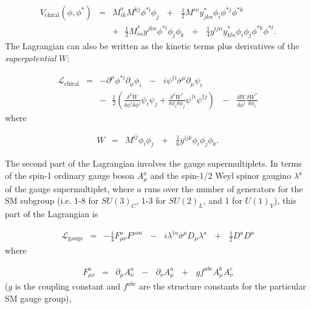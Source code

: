 \documentclass[dissertation.tex]{subfiles}
\begin{document}
\begin{eqnarray}
\label{eq:V_chiral}
V_{\mathrm{chiral}}(\phi, \phi^{*}) &=& M_{ik}^{*}M^{kj}\phi^{*i}\phi_{j}\mbox{ }+\mbox{ }\frac{1}{2}M^{in}y_{jkn}^{*}\phi_{i}\phi^{*j}\phi^{*k}\mbox{ }\nonumber \\
&&+\mbox{ }\frac{1}{2}M_{in}^{*}y^{jkn}\phi^{*i}\phi_{j}\phi_{k}\mbox{ }+\mbox{ }\frac{1}{4}y^{ijn}y_{kln}^{*}\phi_{i}\phi_{j}\phi^{*k}\phi^{*l}.
\end{eqnarray}
%
The Lagrangian can also be written as the kinetic terms plus derivatives of the \textit{superpotential} $W$:

\begin{eqnarray}
\label{eq:L_chiral_W}
\mathcal{L}_{\mathrm{chiral}} &=& -\partial^{\mu}\phi^{*i}\partial_{\mu}\phi_{i}\mbox{ }-\mbox{ }i\psi^{\dag i}\overline{\sigma}^{\mu}\partial_{\mu}\psi_{i}\mbox{ }\nonumber \\
&&-\mbox{ }\frac{1}{2}(\frac{\delta^{2}W}{\delta\phi^{i}\delta\phi^{j}}\psi_{i}\psi_{j} + \frac{\delta^{2}W^{*}}{\delta\phi_{i}\delta\phi_{j}}\psi^{\dag i}\psi^{\dag j})\mbox{ }-\mbox{ }\frac{\delta W}{\delta\phi^{i}}\frac{\delta W^{*}}{\delta\phi_{i}}
\end{eqnarray}
%
where

\begin{eqnarray}
\label{eq:W}
W &=& M^{ij}\phi_{i}\phi_{j}\mbox{ }+\mbox{ }\frac{1}{6}y^{ijk}\phi_{i}\phi_{j}\phi_{k}.
\end{eqnarray}

The second part of the Lagrangian involves the gauge supermultiplets.  In terms of the spin-1 ordinary gauge boson $A_{\mu}^{a}$ and the spin-1/2 Weyl spinor gaugino $\lambda^{a}$ of the gauge supermultiplet, where $a$ runs over the number of generators for the SM subgroup (i.e. 1-8 for $SU(3)_{C}$, 1-3 for $SU(2)_{L}$, and 1 for $U(1)_{Y}$), this part of the Lagrangian is

\begin{eqnarray}
\label{eq:L_gauge}
\mathcal{L}_{\mathrm{gauge}} &=& -\frac{1}{4}F_{\mu\nu}^{a}F^{\mu\nu a}\mbox{ }-\mbox{ }i\lambda^{\dag a}\overline{\sigma}^{\mu}D_{\mu}\lambda^{a}\mbox{ }+\mbox{ }\frac{1}{2}D^{a}D^{a}
\end{eqnarray}
%
where 

\begin{eqnarray}
\label{eq:F}
F_{\mu\nu}^{a} &=& \partial_{\mu}A_{\nu}^{a}\mbox{ }-\mbox{ }\partial_{\nu}A_{\mu}^{a}\mbox{ }+\mbox{ }gf^{abc}A_{\mu}^{b}A_{\nu}^{c}
\end{eqnarray}
%
($g$ is the coupling constant and $f^{abc}$ are the structure constants for the particular SM gauge group), 
\end{document}
